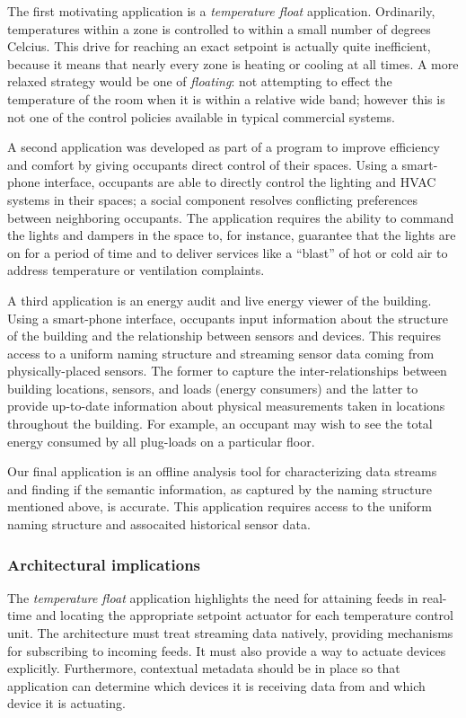 The first motivating application is a {\it temperature float} application.  Ordinarily, temperatures within a zone is controlled to within a small number of degrees Celcius.  This drive for reaching an exact setpoint is actually quite inefficient, because it means that nearly every zone is heating or cooling at all times.  A more relaxed strategy would be one of {\it floating}: not attempting to effect the temperature of the room when it is within a relative wide band; however this is not one of the control policies available in typical commercial systems.  

A second application was developed as part of a program to improve efficiency and comfort by giving occupants direct control of their spaces.  Using a smart-phone interface, occupants are able to directly control the lighting and HVAC systems in their spaces; a social component resolves conflicting preferences between neighboring occupants.  The application requires the ability to command the lights and dampers in the space to, for instance, guarantee that the lights are on for a period of time and to deliver services like a ``blast'' of hot or cold air to address temperature or ventilation complaints.

A third application is an energy audit and live energy viewer of the building.  Using a smart-phone interface, occupants input information about the structure of the building and the relationship between sensors and devices.  This requires access to a uniform naming structure and streaming sensor data coming from physically-placed sensors.  The former to capture the inter-relationships between building locations, sensors, and loads (energy consumers) and the latter to provide up-to-date information about physical measurements taken in locations throughout the building.  For example, an occupant may wish to see the total energy consumed by all plug-loads on a particular floor.

Our final application is an offline analysis tool for characterizing data streams and finding if the semantic information, as captured by the naming structure mentioned above, is accurate.  This application requires access to the uniform naming structure and assocaited historical sensor data.

\subsubsection{Architectural implications}

The \emph{temperature float} application highlights the need for attaining feeds in real-time and locating the appropriate setpoint actuator for each temperature control unit.  The architecture must treat streaming data natively, providing mechanisms for subscribing to incoming feeds.  It must also provide a way to actuate devices explicitly.  Furthermore, contextual metadata should be in place so that application can determine which devices it is receiving data from and which device it is actuating.

